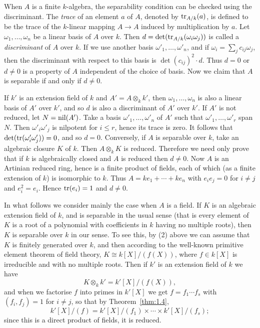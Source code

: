 \begin{remark}
When $A$ is a finite $k$-algebra, the separability condition can be checked using
the discriminant. The \emph{trace} of an element $a$ of $A$, denoted by $\operatorname{tr}_{A/k}(a)$, is
defined to be the trace of the $k$-linear mapping $A \to A$ induced by
multiplication by $a$. Let $\omega_1, \ldots, \omega_n$ be a linear basis of $A$ over $k$. Then
$d = \det(\operatorname{tr}_{A/k}(\omega_i\omega_j))$ is called a \emph{discriminant} of $A$ over $k$. If we use
another basis $\omega'_1, \ldots, \omega'_n$, and if $\omega_i = \sum_j c_{ij}\omega_j$, then the
discriminant with respect to this basis is $\det(c_{ij})^2 \cdot d$. Thus $d = 0$ or
$d \ne 0$ is a property of $A$ independent of the choice of basis. Now we claim that
$A$ is separable if and only if $d \ne 0$.

If $k'$ is an extension field of $k$ and $A' = A \otimes_k k'$, then $\omega_1, \ldots, \omega_n$
is also a linear basis of $A'$ over $k'$, and so $d$ is also a discriminant of $A'$
over $k'$. If $A'$ is not reduced, let $N = \operatorname{nil}(A')$. Take a basis $\omega'_1, \ldots, \omega'_n$
of $A'$ such that $\omega'_1, \ldots, \omega'_r$ span $N$. Then $\omega'_i\omega'_j$ is nilpotent for
$i \le r$, hence its trace is zero. It follows that $\det(\operatorname{tr}(\omega'_i\omega'_j)) = 0$, and so
$d = 0$. Conversely, if $A$ is separable over $k$, take an algebraic closure $K$ of $k$.
Then $A \otimes_k K$ is reduced. Therefore we need only prove that if $k$ is
algebraically closed and $A$ is reduced then $d \ne 0$. Now $A$ is an Artinian reduced
ring, hence is a finite product of fields, each of which (as a finite extension of
$k$) is isomorphic to $k$. Thus $A = ke_1 + \cdots + ke_n$ with $e_ie_j = 0$ for $i \neq j$ and
$e_i^2 = e_i$. Hence $\operatorname{tr}(e_i) = 1$ and $d \ne 0$.
\end{remark}

In what follows we consider mainly the case when $A$ is a field. If $K$ is an
algebraic extension field of $k$, and is separable in the usual sense (that is
every element of $K$ is a root of a polynomial with coefficients in $k$ having no
multiple roots), then $K$ is separable over $k$ in our sense. To see this, by (2)
above we can assume that $K$ is finitely generated over $k$, and then according to
the well-known primitive element theorem of field theory, $K \cong k[X]/(f(X))$,
where $f \in k[X]$ is irreducible and with no multiple roots. Then if $k'$ is an
extension field of $k$ we have
\[
  K \otimes_k k' = k'[X]/(f(X)),
\]
and when we factorise $f$ into primes in $k'[X]$ we get $f = f_1 \cdots f_s$ with
$(f_i, f_j) = 1$ for $i \neq j$, so that by Theorem~\ref{thm:1.4},
\[
  k'[X]/(f) = k'[X]/(f_1) \times \cdots \times k'[X]/(f_s);
\]
since this is a direct product of fields, it is reduced.

